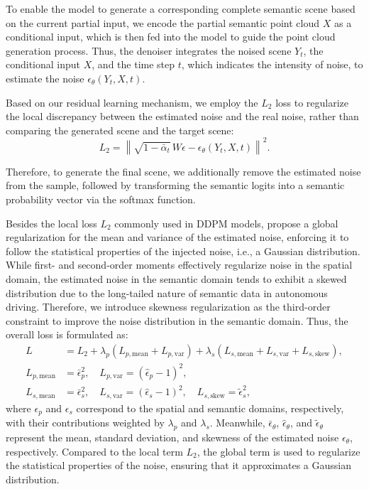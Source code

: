 \documentclass[conference]{IEEEtran}
\begin{document}
To enable the model to generate a corresponding complete semantic scene based on the current partial input, we encode the partial semantic point cloud $X$ as a conditional input, which is then fed into the model to guide the point cloud generation process.
Thus, the denoiser integrates the noised scene $Y_t$, the conditional input $X$, and the time step $t$, which indicates the intensity of noise, to estimate the noise $\epsilon_\theta(Y_t, X, t)$.

Based on our residual learning mechanism, we employ the $L_2$ loss to regularize the local discrepancy between the estimated noise and the real noise, rather than comparing the generated scene and the target scene:
\begin{equation}
  L_2 = \left\| \sqrt{1 - \bar{\alpha}_t}\, W\epsilon - \epsilon_\theta(Y_t, X, t) \right\|^2.
  \label{eq:l2}
\end{equation}

Therefore, to generate the final scene, we additionally remove the estimated noise from the sample, followed by transforming the semantic logits into a semantic probability vector via the softmax function.

Besides the local loss $L_2$ commonly used in DDPM models, \cite{lnunes2025} propose a global regularization for the mean and variance of the estimated noise, enforcing it to follow the statistical properties of the injected noise, i.e., a Gaussian distribution.
While first- and second-order moments effectively regularize noise in the spatial domain, the estimated noise in the semantic domain tends to exhibit a skewed distribution due to the long-tailed nature of semantic data in autonomous driving.
Therefore, we introduce skewness regularization as the third-order constraint to improve the noise distribution in the semantic domain.
Thus, the overall loss is formulated as:
\begin{align}
  L &= L_2 + \lambda_p (L_{p,\mathrm{mean}} + L_{p,\mathrm{var}}) + \lambda_s (L_{s,\mathrm{mean}} + L_{s,\mathrm{var}} + L_{s,\mathrm{skew}}), \nonumber \\
  L_{p,\mathrm{mean}} &= \bar{\epsilon}_p^2, \quad L_{p,\mathrm{var}} = (\hat{\epsilon}_p - 1)^2, \nonumber \\
  L_{s,\mathrm{mean}} &= \bar{\epsilon}_s^2, \quad L_{s,\mathrm{var}} = (\hat{\epsilon}_s - 1)^2, \quad L_{s,\mathrm{skew}} = \tilde{\epsilon}_s^2,
  \label{eq:loss}
\end{align}
where $\epsilon_p$ and $\epsilon_s$ correspond to the spatial and semantic domains, respectively, with their contributions weighted by $\lambda_p$ and $\lambda_s$.
Meanwhile, $\bar{\epsilon}_\theta$, $\hat{\epsilon}_\theta$, and $\tilde{\epsilon}_\theta$ represent the mean, standard deviation, and skewness of the estimated noise $\epsilon_\theta$, respectively.
Compared to the local term $L_2$, the global term is used to regularize the statistical properties of the noise, ensuring that it approximates a Gaussian distribution.
\end{document}
